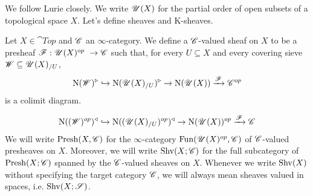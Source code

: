 \documentclass[../thesis.tex]{subfiles}
\begin{document}
We follow Lurie \cite{HTT} closely.
We write $\mathscr{U}(X)$ for the partial order of open subsets of a topological space $X$.
Let's define sheaves and K-sheaves.
\begin{definition}\label{sheaf_on_top}
    Let $X \in \cat{Top}$ and $\mathscr{C}$ an $\infty$-category.
    We define a $\mathscr{C}$-valued sheaf on $X$ to be a presheaf $\F: \Open(X)^{op} \to \C$ such that, for every $U\subseteq X$ and every covering sieve $\mathscr{W} \subseteq \mathscr{U}(X)_{/U}$,
    \[
        \mathrm{N}(\mathscr{W})^{\triangleright} \hookrightarrow \mathrm{N}(\mathscr{U}(X)_{/U})^{\triangleright} \rightarrow \mathrm{N}(\mathscr{U}(X))\xrightarrow{\mathscr{F}}\mathscr{C}^{op}
    \]
    is a colimit diagram.
\end{definition}
\[
    \mathrm{N}((\mathscr{W})^{op})^{\triangleleft} \hookrightarrow \mathrm{N}((\mathscr{U}(X)_{/U})^{op})^{\triangleleft} \rightarrow \mathrm{N}(\mathscr{U}(X))^{op}\xrightarrow{\mathscr{F}}\mathscr{C}
\]
We will write $\mathrm{Presh}(X, \mathscr{C})$ for the $\infty$-category $\mathrm{Fun}(\mathscr{U}(X)^{op}, \mathscr{C})$ of $\mathscr{C}$-valued presheaves on $X$.
Moreover, we will write $\mathrm{Shv}(X;\mathscr{C})$ for the full subcategory of $\mathrm{Presh}(X;\mathscr{C})$ spanned by the $\mathscr{C}$-valued sheaves on $X$.
Whenever we write $\mathrm{Shv}(X)$ without specifying the target category $\mathscr{C}$, we will always mean sheaves valued in spaces, i.e. $\mathrm{Shv}(X;\mathscr{S})$.
\end{document}
